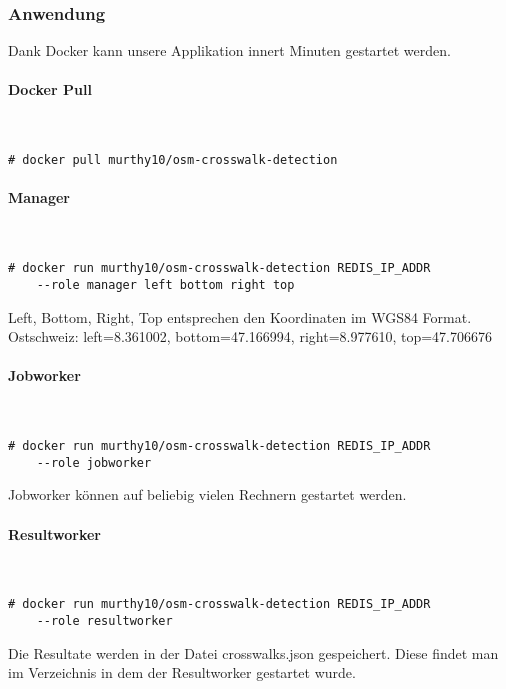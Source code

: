 \newpage
\subsubsection{Anwendung}
Dank Docker kann unsere Applikation innert Minuten gestartet werden.

\paragraph{Docker Pull}\mbox{}\\
\begin{lstlisting}[style=BashInputStyle]
	# docker pull murthy10/osm-crosswalk-detection
\end{lstlisting}

\paragraph{Manager}\mbox{}\\
\begin{lstlisting}[style=BashInputStyle]
	# docker run murthy10/osm-crosswalk-detection REDIS_IP_ADDR 
 	--role manager left bottom right top
\end{lstlisting}
Left, Bottom, Right, Top entsprechen den Koordinaten im WGS84 Format. \\
Ostschweiz: left=8.361002, bottom=47.166994, right=8.977610, top=47.706676

\paragraph{Jobworker}\mbox{}\\
\begin{lstlisting}[style=BashInputStyle]
	# docker run murthy10/osm-crosswalk-detection REDIS_IP_ADDR 
 	--role jobworker
\end{lstlisting}
Jobworker können auf beliebig vielen Rechnern gestartet werden.\\

\paragraph{Resultworker}\mbox{}\\
\begin{lstlisting}[style=BashInputStyle]
	# docker run murthy10/osm-crosswalk-detection REDIS_IP_ADDR 
 	--role resultworker
\end{lstlisting}
Die Resultate werden in der Datei crosswalks.json gespeichert. Diese findet man im Verzeichnis in dem der Resultworker gestartet wurde.

